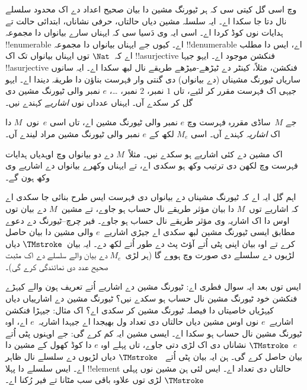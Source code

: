 \documentclass[../../../include/open-logic-section]{subfiles}
\begin{document}

 وچ اسی گل کیتی سی کہ ہر ٹیورنگ مشین دا
بیان صحیح اعداد دے اک محدود سلسلے نال دتا جا سکدا اے۔
ایہ سلسلہ مشین دیاں حالتاں، حرفی نشاناں، ابتدائی حالت
تے ہدایات نوں کوڈ کردا اے۔ اسی ایہ وی دَسیا سی کہ
ایہناں سارے بیانواں دا مجموعہ !!{enumerable} اے۔ کیوں
جے ایہناں بیانواں دا مجموعہ !!{denumerable} اے، ایس دا
مطلب اے کہ~$\Nat$ توں ایہناں بیانواں تک اک
!!a{surjective} فنکشن موجود اے۔ ایہو جیہا !!a{surjective}
فنکشن، مثلاً، کینٹر دے ٹیڑھے-میڑھے طریقے نال لبھ
سکدا اے۔ ایہ سانوں ساریاں ٹیورنگ مشیناں (دے بیانواں)
دی گنتی وار فہرست بناؤن دا طریقہ دیندا اے۔ ایہو جیہی اک
فہرست مقرر کر لئیے، تاں $1$ نمبر، $2$ نمبر، \dots، $e$ نمبر
والی ٹیورنگ مشین دی گل کر سکدے آں۔ ایہناں
عدداں نوں \emph{اشاریے} کہندے نیں۔

\begin{defn}
جے $M$~ساڈی مقررہ فہرست وچ $e$ نمبر والی ٹیورنگ مشین اے،
تاں اسی $e$~نوں~$M$ دا اک \emph{اشاریہ} کہندے آں۔
اسی $M_e$ لکھ کے $e$ نمبر والی ٹیورنگ مشین مراد لیندے آں۔
\end{defn}

اک مشین دے کئی اشاریے ہو سکدے نیں۔ مثلاً~$M$ دے
دو بیانواں وچ اوہدیاں ہدایات فہرست وچ لکھن دی ترتیب
وکھ ہو سکدی اے، تے ایہناں وکھرے بیانواں دے اشاریے
وی وکھ ہون گے۔

اہم گل ایہ اے کہ ٹیورنگ مشیناں دے بیانواں دی فہرست
ایس طرح بنائی جا سکدی اے کہ اشاریے توں~$M$ دا بیان
مؤثر طریقے نال حساب ہو جاوے، تے مشین~$M$ دے بیان توں
اوس دا اک اشاریہ وی مؤثر طریقے نال حساب ہو جاوے۔
فیر چرچ--ٹیورنگ دے دعوے مطابق ایسی ٹیورنگ مشین
لبھ سکدی اے جیڑی اشاریے~$e$ والی مشین دا بیان
حاصل کرے تے اوہ بیان اپنی پٹی اُتے آؤٹ پٹ دے طور
اُتے لکھ دے۔ ایہ بیان~$\TMstroke$ دیاں لڑیوں
دے سلسلے دی صورت وچ ہووے گا (ہر لڑی~$M_e$
دے بیان والے سلسلے دے اک مثبت صحیح عدد دی نمائندگی کرے گی)۔

ایس توں بعد ایہ سوال فطری اے: ٹیورنگ مشین دے اشاریے
اُتے تعریف ہون والے کیہڑے فنکشن خود ٹیورنگ مشین نال
حساب ہو سکدے نیں؟ ٹیورنگ مشین دے اشارییاں دیاں
کیہڑیاں خاصیتاں دا فیصلہ ٹیورنگ مشین کر سکدی اے؟
اک مثال: جیہڑا فنکشن اشاریے~$e$ نوں اوس مشین دیاں
حالتاں دی تعداد ول بھیجدا اے جیہدا اشاریہ~$e$ اے،
اوہ ٹیورنگ مشین نال حساب ہو سکدا اے۔ ایسی مشین ایہ کم
کرے گی: جے اوہنوں پٹی اُتے $e$~$\TMstroke$ نشاناں دی
اک لڑی دتی جاوے، تاں پہلے اوہ $e$ دا کوڈ کھول کے
مشین دا بیان حاصل کرے گی۔ ہن ایہ بیان پٹی اُتے
~$\TMstroke$ دیاں لڑیوں دے سلسلے نال ظاہر اے۔ ایس
سلسلے دا پہلا !!{element} حالتاں دی تعداد اے۔ ایس لئی
ہن مشین نوں پہلی $\TMstroke$ لڑی توں علاوہ باقی سب
مٹانا تے فیر رُکنا اے۔
\end{document}
